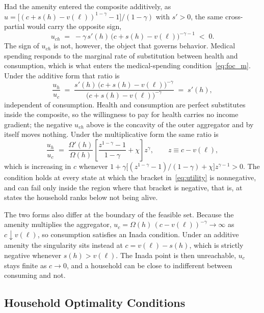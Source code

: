 \documentclass[12pt,a4paper]{article}
\begin{document}
\begin{appendices}
Had the amenity entered the composite additively, as $u = \bigl[(c + s(h) - v(\ell))^{1-\gamma} - 1\bigr]/(1-\gamma)$ with $s' > 0$, the same cross-partial would carry the opposite sign,
\[
u_{ch} \;=\; -\gamma\, s'(h)\, \bigl(c + s(h) - v(\ell)\bigr)^{-\gamma-1} \;<\; 0 .
\]
The sign of $u_{ch}$ is not, however, the object that governs behavior. Medical spending responds to the marginal rate of substitution between health and consumption, which is what enters the medical-spending condition~\eqref{eq:foc_m}. Under the additive form that ratio is
\[
\frac{u_h}{u_c} \;=\; \frac{s'(h)\,\bigl(c+s(h)-v(\ell)\bigr)^{-\gamma}}{\bigl(c+s(h)-v(\ell)\bigr)^{-\gamma}} \;=\; s'(h),
\]
independent of consumption. Health and consumption are perfect substitutes inside the composite, so the willingness to pay for health carries no income gradient; the negative $u_{ch}$ above is the concavity of the outer aggregator and by itself moves nothing. Under the multiplicative form the same ratio is
\[
\frac{u_h}{u_c} \;=\; \frac{\Omega'(h)}{\Omega(h)}\left[\frac{z^{1-\gamma}-1}{1-\gamma} + \chi\right] z^{\gamma}, \qquad z \equiv c - v(\ell),
\]
which is increasing in $c$ whenever $1 + \gamma\bigl[(z^{1-\gamma}-1)/(1-\gamma) + \chi\bigr]z^{\gamma-1} > 0$. The condition holds at every state at which the bracket in~\eqref{eq:utility} is nonnegative, and can fail only inside the region where that bracket is negative, that is, at states the household ranks below not being alive.

The two forms also differ at the boundary of the feasible set. Because the amenity multiplies the aggregator, $u_c = \Omega(h)\,(c-v(\ell))^{-\gamma} \to \infty$ as $c \downarrow v(\ell)$, so consumption satisfies an Inada condition. Under an additive amenity the singularity sits instead at $c = v(\ell) - s(h)$, which is strictly negative whenever $s(h) > v(\ell)$. The Inada point is then unreachable, $u_c$ stays finite as $c \to 0$, and a household can be close to indifferent between consuming and not.

\subsection{Household Optimality Conditions}
\label{app:focs}


\end{appendices}
\end{document}
